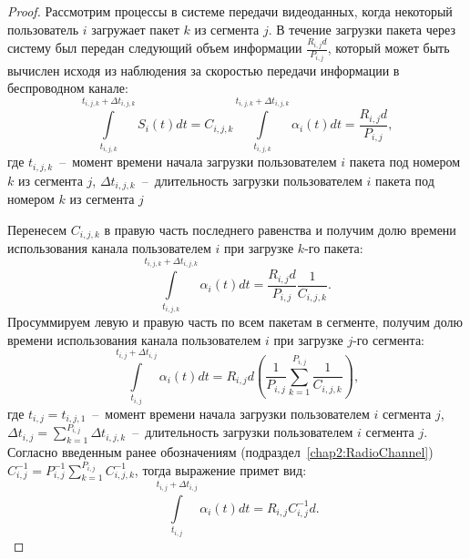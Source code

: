 \begin{proof}
Рассмотрим процессы в системе передачи видеоданных, когда некоторый пользователь $i$ загружает пакет $k$ из сегмента $j$. В течение загрузки пакета через систему был передан следующий объем информации $\frac{R_{i,j} d }{P_{i,j}}$, который может быть вычислен исходя из наблюдения за скоростью передачи информации в беспроводном канале:
\begin{equation}
	\nonumber
	\int\limits_{t_{i,j,k}}^{t_{i,j,k} + \Delta t_{i,j,k}} S_i(t) dt = C_{i,j,k} \int\limits_{t_{i,j,k}}^{t_{i,j,k} + \Delta t_{i,j,k}}\alpha_i(t) dt = \frac{R_{i,j} d }{P_{i,j}},
\end{equation}
где $t_{i,j,k}$~--~момент времени начала загрузки пользователем $i$ пакета под номером $k$ из сегмента $j$, $\Delta t_{i,j,k}$~--~длительность загрузки пользователем $i$ пакета под номером $k$ из сегмента $j$

Перенесем $C_{i,j,k}$ в правую часть последнего равенства и получим долю времени использования канала пользователем $i$ при загрузке $k$-го пакета:
\begin{equation}
	\nonumber
	\int\limits_{t_{i,j,k}}^{t_{i,j,k} + \Delta t_{i,j,k}}\alpha_i(t) dt = \frac{R_{i,j} d }{P_{i,j}}\frac{1}{C_{i,j,k}}.
\end{equation}
Просуммируем левую и правую часть по всем пакетам в сегменте, получим долю времени использования канала пользователем $i$ при загрузке $j$-го сегмента:
\begin{equation}
	\nonumber
	\int\limits_{t_{i,j}}^{t_{i,j} + \Delta t_{i,j}}\alpha_i(t) dt = R_{i,j} d\left( \frac{1}{P_{i,j}}\sum\limits_{k=1}^{P_{i,j}} \frac{1}{C_{i,j,k}}\right),
\end{equation}
где $t_{i,j} = t_{i,j,1}$~--~момент времени начала загрузки пользователем $i$ сегмента $j$, $\Delta t_{i,j} = \sum_{k = 1}^{P_{i,j}} \Delta t_{i,j,k}$~--~длительность загрузки пользователем $i$ сегмента $j$. Согласно введенным ранее обозначениям (подраздел~\ref{chap2:RadioChannel}) $C_{i,j}^{-1} = P_{i,j}^{-1}\sum_{k=1}^{P_{i,j}} C_{i,j,k}^{-1}$, тогда выражение примет вид:
\begin{equation}
	\nonumber
	\int\limits_{t_{i,j}}^{t_{i,j} + \Delta t_{i,j}}\alpha_i(t) dt = R_{i,j}C_{i,j}^{-1} d.
\end{equation}



\end{proof}
